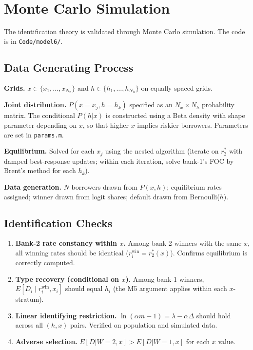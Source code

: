 \documentclass[12pt]{article}
\theoremstyle{plain}
\theoremstyle{plain}
\theoremstyle{definition}  %
\theoremstyle{remark}  %
\begin{document}

\newpage
\section{Monte Carlo Simulation}\label{sec:simulation}

The identification theory is validated through Monte Carlo simulation. The code is in \texttt{Code/model6/}.

\subsection{Data Generating Process}\label{sec:dgp}

\textbf{Grids.} $x \in \{x_1, \ldots, x_{N_x}\}$ and $h \in \{h_1, \ldots, h_{N_h}\}$ on equally spaced grids.

\textbf{Joint distribution.} $P(x=x_j, h=h_k)$ specified as an $N_x \times N_h$ probability matrix.  The conditional $P(h|x)$ is constructed using a Beta density with shape parameter depending on $x$, so that higher $x$ implies riskier borrowers.  Parameters are set in \texttt{params.m}.

\textbf{Equilibrium.} Solved for each $x_j$ using the nested algorithm (iterate on $r_2^*$ with damped best-response updates; within each iteration, solve bank-1's FOC by Brent's method for each $h_k$).

\textbf{Data generation.} $N$ borrowers drawn from $P(x,h)$; equilibrium rates assigned; winner drawn from logit shares; default drawn from Bernoulli($h$).

\subsection{Identification Checks}\label{sec:id_checks}

\begin{enumerate}
    \item \textbf{Bank-2 rate constancy within $x$.}  Among bank-2 winners with the same $x$, all winning rates should be identical ($r_i^{\text{win}} = r_2^*(x)$).  Confirms equilibrium is correctly computed.
    
    \item \textbf{Type recovery (conditional on $x$).}  Among bank-1 winners, $E[D_i \mid r_i^{\text{win}}, x_i]$ should equal $h_i$ (the M5 argument applies within each $x$-stratum).
    
    \item \textbf{Linear identifying restriction.}  $\ln(\alpha m - 1) = \lambda - \alpha\Delta$ should hold across all $(h, x)$ pairs.  Verified on population and simulated data.
    
    \item \textbf{Adverse selection.}  $E[D|W\!=\!2, x] > E[D|W\!=\!1, x]$ for each $x$ value.
\end{enumerate}
\end{document}
